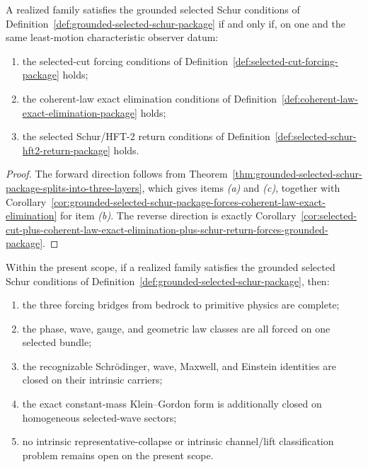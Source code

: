 \begin{corollary}
\label{cor:grounded-selected-schur-package-iff-selected-cut-plus-coherent-law-plus-schur-return}
A realized family satisfies the grounded selected Schur conditions of
Definition~\ref{def:grounded-selected-schur-package} if and only if, on one and
the same least-motion characteristic observer datum:
\begin{enumerate}[label=(\alph*), leftmargin=2em, itemsep=0.2em]
\item the selected-cut forcing conditions of
      Definition~\ref{def:selected-cut-forcing-package} holds;
\item the coherent-law exact elimination conditions of
      Definition~\ref{def:coherent-law-exact-elimination-package} holds;
\item the selected Schur/HFT-2 return conditions of
      Definition~\ref{def:selected-schur-hft2-return-package} holds.
\end{enumerate}
\end{corollary}

\begin{proof}
The forward direction follows from
Theorem~\ref{thm:grounded-selected-schur-package-splits-into-three-layers},
which gives items \emph{(a)} and \emph{(c)}, together with
Corollary~\ref{cor:grounded-selected-schur-package-forces-coherent-law-exact-elimination}
for item \emph{(b)}. The reverse direction is exactly
Corollary~\ref{cor:selected-cut-plus-coherent-law-exact-elimination-plus-schur-return-forces-grounded-package}.
\end{proof}

\begin{corollary}
\label{cor:grounded-selected-schur-package-closes-intrinsic-surface}
Within the present scope, if a realized family satisfies the grounded
selected Schur conditions of
Definition~\ref{def:grounded-selected-schur-package}, then:
\begin{enumerate}[label=(\alph*), leftmargin=2em, itemsep=0.2em]
\item the three forcing bridges from bedrock to primitive physics are
      complete;
\item the phase, wave, gauge, and geometric law classes are all forced on one
      selected bundle;
\item the recognizable Schr\"odinger, wave, Maxwell, and Einstein identities
      are closed on their intrinsic carriers;
\item the exact constant-mass Klein--Gordon form is additionally closed
      on homogeneous selected-wave sectors;
\item no intrinsic representative-collapse or intrinsic channel/lift
      classification problem remains open on the present scope.
\end{enumerate}
\end{corollary}

